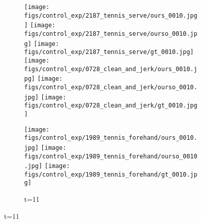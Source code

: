 \documentclass{article}
\begin{document}
\begin{appendix}
\begin{figure*}[!thbp]
    \centering
    \vspace{60pt}
	\begin{subfigure}{0.04\linewidth}
        \raggedleft
    \end{subfigure}
    \begin{subfigure}{0.12\linewidth}
        \caption*{t=11}
        \vspace{-7pt}
	    \texttt{[image: figs/control\_exp/2187\_tennis\_serve/ours\_0010.jpg]}
	    \texttt{[image: figs/control\_exp/2187\_tennis\_serve/ourso\_0010.jpg]}
	    \vspace{.2cm}
  		\texttt{[image: figs/control\_exp/2187\_tennis\_serve/gt\_0010.jpg]}
  		\texttt{[image: figs/control\_exp/0728\_clean\_and\_jerk/ours\_0010.jpg]}
  		\texttt{[image: figs/control\_exp/0728\_clean\_and\_jerk/ourso\_0010.jpg]}
  		\vspace{.2cm}
  		\texttt{[image: figs/control\_exp/0728\_clean\_and\_jerk/gt\_0010.jpg]}
  		\caption*{t=11}
  		\vspace{-7pt}
  		\texttt{[image: figs/control\_exp/1989\_tennis\_forehand/ours\_0010.jpg]}
  		\texttt{[image: figs/control\_exp/1989\_tennis\_forehand/ourso\_0010.jpg]}
  		\vspace{.2cm}
  		\texttt{[image: figs/control\_exp/1989\_tennis\_forehand/gt\_0010.jpg]}

\end{subfigure}
\end{figure*}
\end{appendix}
\end{document}
